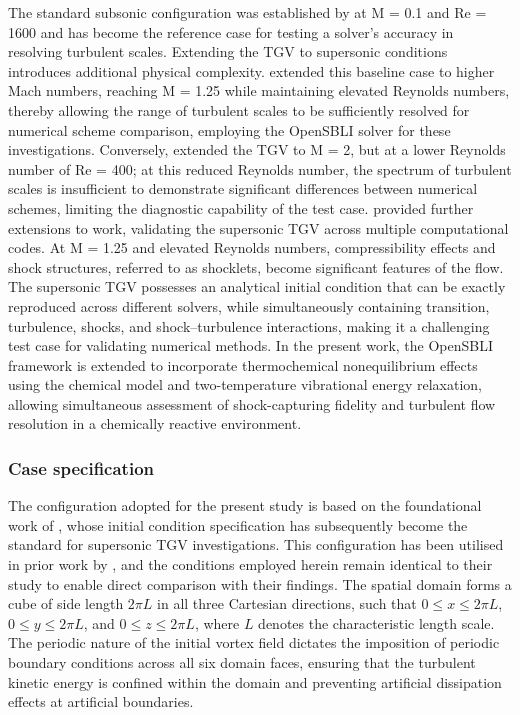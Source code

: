 The standard subsonic configuration was established by \citep{DeBonis2013} at M = 0.1 and Re = 1600 and has become the reference case for testing a solver's accuracy in resolving turbulent scales. Extending the \gls{TGV} to supersonic conditions introduces additional physical complexity. \citep{LusherSandham2021} extended this baseline case to higher Mach numbers, reaching M = 1.25 while maintaining elevated Reynolds numbers, thereby allowing the range of turbulent scales to be sufficiently resolved for numerical scheme comparison, employing the OpenSBLI solver for these investigations. Conversely, \citep{PengYang2018} extended the \gls{TGV} to M = 2, but at a lower Reynolds number of Re = 400; at this reduced Reynolds number, the spectrum of turbulent scales is insufficient to demonstrate significant differences between numerical schemes, limiting the diagnostic capability of the test case. \citep{ChapelierEtAl2024} provided further extensions to \citep{LusherSandham2021} work, validating the supersonic \gls{TGV} across multiple computational codes. At M = 1.25 and elevated Reynolds numbers, compressibility effects and shock structures, referred to as shocklets, become significant features of the flow. The supersonic \gls{TGV} possesses an analytical initial condition that can be exactly reproduced across different solvers, while simultaneously containing transition, turbulence, shocks, and shock--turbulence interactions, making it a challenging test case for validating numerical methods. In the present work, the OpenSBLI framework is extended to incorporate thermochemical nonequilibrium effects using the \citep{Park1990} chemical model and two-temperature vibrational energy relaxation, allowing simultaneous assessment of shock-capturing fidelity and turbulent flow resolution in a chemically reactive environment.


\subsubsection{Case specification}

The configuration adopted for the present study is based on the foundational work of \citep{DeBonis2013}, whose initial condition specification has subsequently become the standard for supersonic \gls{TGV} investigations. This configuration has been utilised in prior work by \citep{LusherSandham2021}, and the conditions employed herein remain identical to their study to enable direct comparison with their findings. The spatial domain forms a cube of side length $2\pi L$ in all three Cartesian directions, such that $0 \leq x \leq 2\pi L$, $0 \leq y \leq 2\pi L$, and $0 \leq z \leq 2\pi L$, where $L$ denotes the characteristic length scale. The periodic nature of the initial vortex field dictates the imposition of periodic boundary conditions across all six domain faces, ensuring that the turbulent kinetic energy is confined within the domain and preventing artificial dissipation effects at artificial boundaries.


